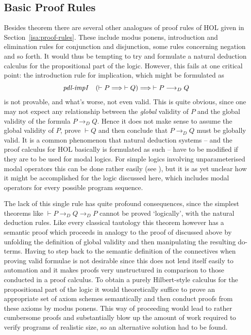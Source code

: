 \subsection{Basic Proof Rules}
Besides theorem  there are several other analogues
of proof rules of HOL given in Section~\ref{isa:proof-rules}. These include
modus ponens, introduction and elimination rules for conjunction and
disjunction, some rules concerning negation and so forth. It would thus be
tempting to try and formulate a natural deduction calculus for the propositional
part of the logic. However, this fails at one critical point: the introduction
rule for implication, which might be formulated as
\[
\mbox{\emph{pdl-impI}}\quad ({\vdash P} \Longrightarrow {\vdash Q}) \Longrightarrow {\vdash P \longrightarrow_D Q}
\]
is not provable, and what's worse, not even valid. This is quite obvious, since
one may not expect any relationship between the \emph{global} validity of $P$ and the
global validity of the formula $P \longrightarrow_D Q$. Hence it does not make sense to assume
the global validity of $P$, prove $\vdash Q$ and then conclude that $P\longrightarrow_D Q$ must be
globally valid. It is a common phenomenon that natural deduction systems -- and
the proof calculus for HOL basically is formulated as such -- have to be
modified if they are to be used for modal logics. For simple logics involving
unparameterised modal operators this can be done rather easily (see
\cite{Fitting93}), but it is as yet unclear how it might be accomplished for the
logic discussed here, which includes modal operators for every possible program
sequence. 

The lack of this single rule has quite profound consequences, since the simplest
theorems like $\vdash {P \longrightarrow_D Q \longrightarrow_D P}$ cannot be proved `logically', \IE with the
natural deduction rules. Like every classical tautology this theorem however has
a semantic proof which proceeds in analogy to the proof of 
discussed above by unfolding the definition of global validity and then
manipulating the resulting do-terms. Having to step back to the semantic
definition of the connectives when proving valid formulae is not desirable since
this does not lend itself easily to automation and it makes proofs very
unstructured in comparison to those conducted in a proof calculus.  To obtain a
purely Hilbert-style calculus for the propositional part of the logic it would
theoretically suffice to prove an appropriate set of axiom schemes semantically
and then conduct proofs from these axioms by modus ponens. This way of
proceeding would lead to rather cumbersome proofs and substantially blow up the
amount of work required to verify programs of realistic size, so an alternative
solution had to be found.

